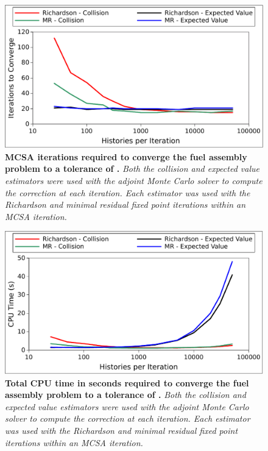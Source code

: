 \begin{figure}[t!]
  \begin{center}
    \includegraphics[width=6in]{chapters/spn_equations/estimator_iters.pdf}
  \end{center}
  \caption{\textbf{MCSA iterations required to converge the fuel
      assembly problem to a tolerance of .} \textit{Both the
      collision and expected value estimators were used with the
      adjoint Monte Carlo solver to compute the correction at each
      iteration. Each estimator was used with the Richardson and
      minimal residual fixed point iterations within an MCSA
      iteration.}}
  \label{fig:spn_estimator_iters}
\end{figure}

\begin{figure}[t!]
  \begin{center}
    \includegraphics[width=6in]{chapters/spn_equations/estimator_time.pdf}
  \end{center}
  \caption{\textbf{Total CPU time in seconds required to converge the
      fuel assembly problem to a tolerance of .}
    \textit{Both the collision and expected value estimators were used
      with the adjoint Monte Carlo solver to compute the correction at
      each iteration. Each estimator was used with the Richardson and
      minimal residual fixed point iterations within an MCSA
      iteration.}}
  \label{fig:spn_estimator_time}
\end{figure}

